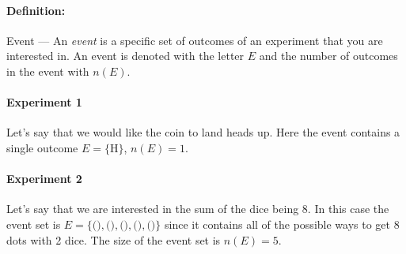 \documentclass[a4paper,11pt]{report}
\def\Definition#1#2{\paragraph{Definition:} #1 --- #2}
\begin{document}
\Definition{Event}{An {\em event} is a specific set of outcomes of an
  experiment that you are interested in. An event is denoted with the
  letter \(E\) and the number of outcomes in the event with \(n(E)\).}

\paragraph{Experiment 1} Let's say that we would like the coin to land
heads up. Here the event contains a single outcome
\(E=\{\textrm{H}\}\), \(n(E)=1\).

\paragraph{Experiment 2} Let's say that we are interested in the sum
of the dice being 8. In this case the event set is
$E=\{($$),($$),($$),($$),($$)\}$
since it contains all of the possible ways to get 8 dots with 2 dice.
The size of the event set is \(n(E)=5\).
\end{document}
